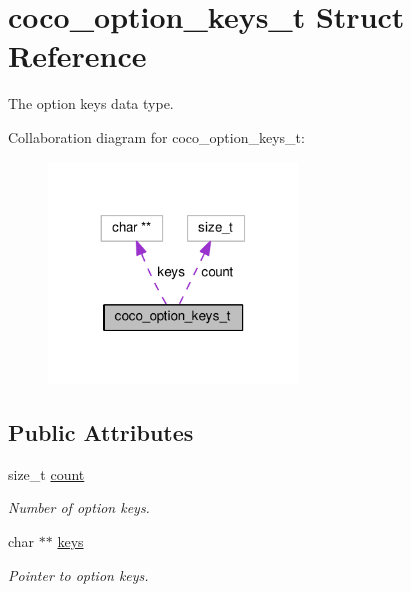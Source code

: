 \hypertarget{structcoco__option__keys__t}{}\section{coco\+\_\+option\+\_\+keys\+\_\+t Struct Reference}
\label{structcoco__option__keys__t}


The option keys data type.  




Collaboration diagram for coco\+\_\+option\+\_\+keys\+\_\+t\+:\nopagebreak
\begin{figure}[H]
\begin{center}
\leavevmode
\includegraphics[width=188pt]{structcoco__option__keys__t__coll__graph}
\end{center}
\end{figure}
\subsection*{Public Attributes}
\begin{DoxyCompactItemize}
\item 
size\+\_\+t \hyperlink{structcoco__option__keys__t_ae358ab3de37617b46f3c483739b4225a}{count}\hypertarget{structcoco__option__keys__t_ae358ab3de37617b46f3c483739b4225a}{}\label{structcoco__option__keys__t_ae358ab3de37617b46f3c483739b4225a}

\begin{DoxyCompactList}\small\item\em Number of option keys. \end{DoxyCompactList}\item 
char $\ast$$\ast$ \hyperlink{structcoco__option__keys__t_a82840d07bce266dfda8a83973fef2b43}{keys}\hypertarget{structcoco__option__keys__t_a82840d07bce266dfda8a83973fef2b43}{}\label{structcoco__option__keys__t_a82840d07bce266dfda8a83973fef2b43}

\begin{DoxyCompactList}\small\item\em Pointer to option keys. \end{DoxyCompactList}\end{DoxyCompactItemize}


